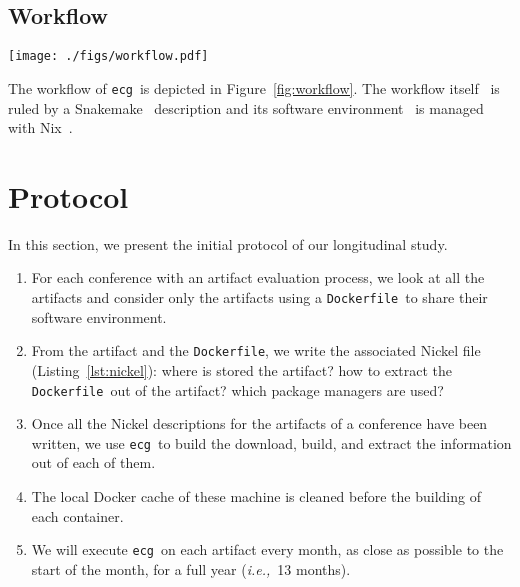 \documentclass[sigconf,natbib=false]{acmart}
\newcommand{\ie}{\emph{i.e.,}}
\newcommand{\df}{\texttt{Dockerfile}}
\newcommand{\ecg}{\texttt{ecg}}
\newcommand{\todo}[1]{{\color{red}{TODO: #1}}}
\begin{document}
\subsection{Workflow}\label{sec:workflow}

\begin{figure*}
  \centering
  \texttt{[image: ./figs/workflow.pdf]}
  \caption{
    Workflow of \ecg.
    Each description of an artifact is verified with the Nickel contract and then converted in a JSON representation.
    This JSON representation is then read by \ecg\ to
    download the artifact,
    compute the hash of its content,
    build the container from the \df, and
    extract the software environment information from the built container.
    \ecg\ outputs files containing the information about the artifact and its \df\ .
  }
  \label{fig:workflow}
\end{figure*}

The workflow of \ecg\ is depicted in Figure~\ref{fig:workflow}.
The workflow itself~\cite{ecg_workflow} is ruled by a Snakemake~\cite{koster2012snakemake} description and its software environment~\cite{ecg_nix} is managed with Nix~\cite{dolstra_nix_2004}.

% 

\section{Protocol}\label{sec:protocol}

In this section, we present the initial protocol of our longitudinal study.

\begin{enumerate}
\item For each conference with an artifact evaluation process, we look at all the artifacts and consider only the artifacts using a \df\ to share their software environment.
\item From the artifact and the \df, we write the associated Nickel file (Listing~\ref{lst:nickel}): where is stored the artifact? how to extract the \df\ out of the artifact? which package managers are used?
\item Once all the Nickel descriptions for the artifacts of a conference have been written, we use \ecg\ to build the download, build, and extract the information out of each of them.
\item The local Docker cache of these machine is cleaned before the building of each container.
\item We will execute \ecg\ on each artifact every month, as close as possible to the start of the month, for a full year (\ie\ 13 months).
\end{enumerate}
\end{document}
